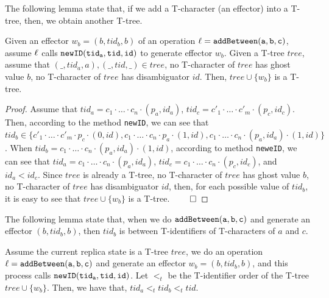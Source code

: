 The following lemma state that, if we add a T-character (an effector) into a T-tree, then, we obtain another T-tree.

\begin{lemma}
\label{lemma:if we add a T-character (an effector) into a T-tree, then we obtain another T-tree}
Given an effector $w_b = (b,tid_b,b)$ of an operation $\alabel = \alabelshort[{\tt addBetween}]{a,b,c}$, assume $\ell$ calls $\alabelshort[{\tt newID}]{tid_a,tid,id}$ to generate effector $w_b$. Given a T-tree $tree$, assume that $(\_,tid_a,a),(\_,tid,\_) \in tree$, no T-character of $tree$ has ghost value $b$, no T-character of $tree$ has disambiguator $id$. Then, $tree \cup \{ w_b \}$ is a T-tree.
\end{lemma}

\begin {proof}
Assume that $tid_a = c_1 \cdot \ldots \cdot c_n \cdot (p_a,id_a)$, $tid_c = c'_1 \cdot \ldots \cdot c'_m \cdot (p_c,id_c)$. Then, according to the method {\tt newID}, we can see that $tid_b \in \{ c'_1 \cdot \ldots \cdot c'_m \cdot p_c \cdot (0,id), c_1 \cdot \ldots \cdot c_n \cdot p_a \cdot (1,id), c_1 \cdot \ldots \cdot c_n \cdot (p_a,id_a) \cdot (1,id) \}$. When $tid_b = c_1 \cdot \ldots \cdot c_n \cdot (p_a,id_a) \cdot (1,id)$, according to method {\tt neweID}, we can see that $tid_a = c_1 \cdot \ldots \cdot c_n \cdot (p_a,id_a)$, $tid_c = c_1 \cdot \ldots \cdot c_n \cdot (p_c,id_c)$, and $id_a < id_c$. Since $tree$ is already a T-tree, no T-character of $tree$ has ghost value $b$, no T-character of $tree$ has disambiguator $id$, then, for each possible value of $tid_b$, it is easy to see that $tree \cup \{ w_b \}$ is a T-tree. $\qed$
\end {proof}

The following lemma state that, when we do $\alabelshort[{\tt addBetween}]{a,b,c}$ and generate an effector $(b,tid_b,b)$, then $tid_b$ is between T-identifiers of T-characters of $a$ and $c$.

\begin{lemma}
\label{lemma:when we do addBetween(a,b,c) and generate an effector (b,tid_b,b) with newID(tid_a,tid_x,id), then tid_b is between tid_a and tid_x}
Assume the current replica state is a T-tree $tree$, we do an operation $\alabel = \alabelshort[{\tt addBetween}]{a,b,c}$ and generate an effector $w_b = (b,tid_b,b)$, and this process calls $\alabelshort[{\tt newID}]{tid_a,tid,id}$. Let $<_t$ be the T-identifier order of the T-tree $tree \cup \{ w_b \}$. Then, we have that, $tid_a <_t tid_b <_t tid$.
\end{lemma}


